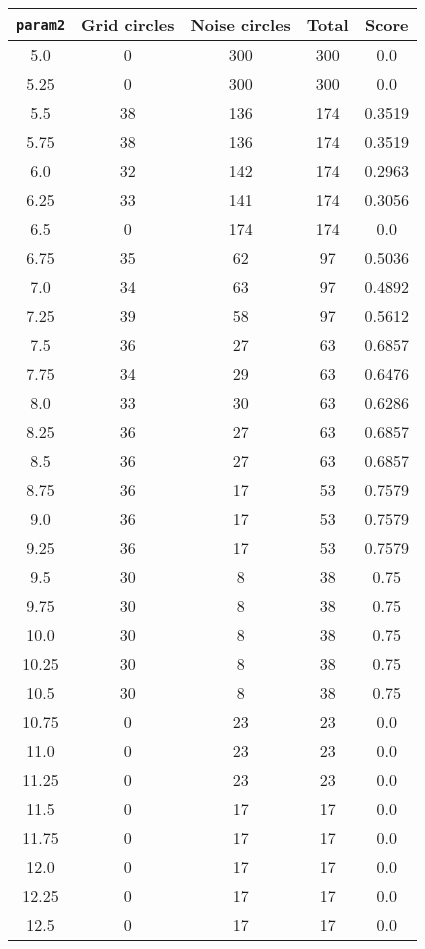 \documentclass[letterpaper, 12pt]{article}
\begin{document}
\begin{longtable}{|c|c|c|c|c|}
\hline
\textbf{\texttt{param2}} & \textbf{Grid circles} & \textbf{Noise circles} & \textbf{Total} & \textbf{Score} \\
\hline
5.0 & 0 & 300 & 300 & 0.0 \\
\hline
5.25 & 0 & 300 & 300 & 0.0 \\
\hline
5.5 & 38 & 136 & 174 & 0.3519 \\
\hline
5.75 & 38 & 136 & 174 & 0.3519 \\
\hline
6.0 & 32 & 142 & 174 & 0.2963 \\
\hline
6.25 & 33 & 141 & 174 & 0.3056 \\
\hline
6.5 & 0 & 174 & 174 & 0.0 \\
\hline
6.75 & 35 & 62 & 97 & 0.5036 \\
\hline
7.0 & 34 & 63 & 97 & 0.4892 \\
\hline
7.25 & 39 & 58 & 97 & 0.5612 \\
\hline
7.5 & 36 & 27 & 63 & 0.6857 \\
\hline
7.75 & 34 & 29 & 63 & 0.6476 \\
\hline
8.0 & 33 & 30 & 63 & 0.6286 \\
\hline
8.25 & 36 & 27 & 63 & 0.6857 \\
\hline
8.5 & 36 & 27 & 63 & 0.6857 \\
\hline
8.75 & 36 & 17 & 53 & 0.7579 \\
\hline
9.0 & 36 & 17 & 53 & 0.7579 \\
\hline
9.25 & 36 & 17 & 53 & 0.7579 \\
\hline
9.5 & 30 & 8 & 38 & 0.75 \\
\hline
9.75 & 30 & 8 & 38 & 0.75 \\
\hline
10.0 & 30 & 8 & 38 & 0.75 \\
\hline
10.25 & 30 & 8 & 38 & 0.75 \\
\hline
10.5 & 30 & 8 & 38 & 0.75 \\
\hline
10.75 & 0 & 23 & 23 & 0.0 \\
\hline
11.0 & 0 & 23 & 23 & 0.0 \\
\hline
11.25 & 0 & 23 & 23 & 0.0 \\
\hline
11.5 & 0 & 17 & 17 & 0.0 \\
\hline
11.75 & 0 & 17 & 17 & 0.0 \\
\hline
12.0 & 0 & 17 & 17 & 0.0 \\
\hline
12.25 & 0 & 17 & 17 & 0.0 \\
\hline
12.5 & 0 & 17 & 17 & 0.0 \\

\end{longtable}
\end{document}
